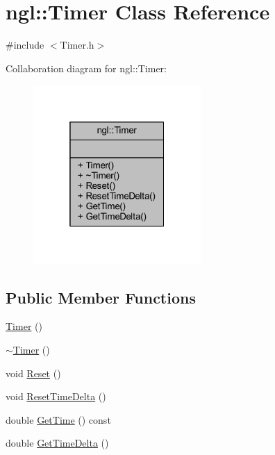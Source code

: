 \hypertarget{classngl_1_1_timer}{}\section{ngl\+:\+:Timer Class Reference}
\label{classngl_1_1_timer}


{\ttfamily \#include $<$Timer.\+h$>$}



Collaboration diagram for ngl\+:\+:Timer\+:
\nopagebreak
\begin{figure}[H]
\begin{center}
\leavevmode
\includegraphics[width=181pt]{classngl_1_1_timer__coll__graph}
\end{center}
\end{figure}
\subsection*{Public Member Functions}
\begin{DoxyCompactItemize}
\item 
\mbox{\hyperlink{classngl_1_1_timer_a124c8701a5b8717afb4473d36aa70c28}{Timer}} ()
\item 
\mbox{\hyperlink{classngl_1_1_timer_ae68f9fcbb71b99c1a9a5590b779e6f92}{$\sim$\+Timer}} ()
\item 
void \mbox{\hyperlink{classngl_1_1_timer_a119e94535c7ecba9ed6d823c5facd418}{Reset}} ()
\item 
void \mbox{\hyperlink{classngl_1_1_timer_afb2c809f08d064f89e0ef2e96a151c3b}{Reset\+Time\+Delta}} ()
\item 
double \mbox{\hyperlink{classngl_1_1_timer_abe1669142b7197ec95f85190919f8836}{Get\+Time}} () const
\item 
double \mbox{\hyperlink{classngl_1_1_timer_a73e8e6aec1d10601a0e027a8d27732ca}{Get\+Time\+Delta}} ()
\end{DoxyCompactItemize}


